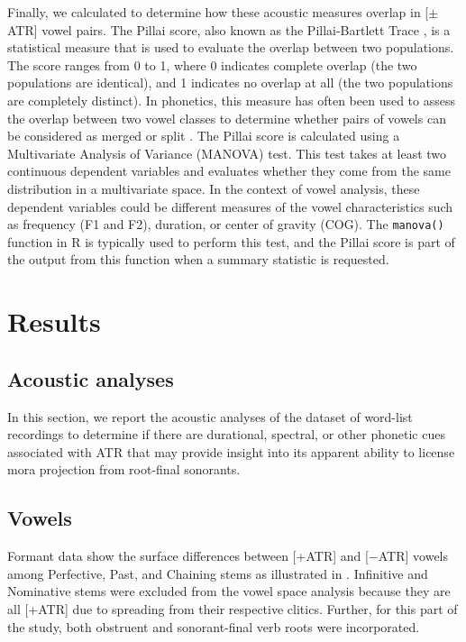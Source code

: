 \documentclass[output=paper,colorlinks,citecolor=brown]{langscibook}
\begin{document}
Finally, we calculated  to determine how these acoustic measures overlap in [$\pm$ATR] vowel pairs. The Pillai score, also known as the Pillai-Bartlett Trace \citep{pillai1955}, is a statistical measure that is used to evaluate the overlap between two populations. The score ranges from 0 to 1, where 0 indicates complete overlap (the two populations are identical), and 1 indicates no overlap at all (the two populations are completely distinct). In phonetics, this measure has often been used to assess the overlap between two vowel classes to determine whether pairs of vowels can be considered as merged or split \citep{freeman2023production, kelley2020comparison, mairanoetal2019}. The Pillai score is calculated using a Multivariate Analysis of Variance (MANOVA) test. This test takes at least two continuous dependent variables and evaluates whether they come from the same distribution in a multivariate space. In the context of vowel analysis, these dependent variables could be different measures of the vowel characteristics such as frequency (F1 and F2), duration, or center of gravity (COG). The \texttt{manova()} function in R is typically used to perform this test, and the Pillai score is part of the output from this function when a summary statistic is requested.

\section{Results}
\label{sec-res}

\subsection{Acoustic analyses}
\label{subsec-acous}

In this section, we report the acoustic analyses of the dataset of word-list recordings to determine if there are durational, spectral, or other phonetic cues associated with ATR that may provide insight into its apparent ability to license mora projection from root-final sonorants.

\subsection{Vowels}
\label{subsec-vow}

Formant data show the surface differences between [+ATR] and [−ATR] vowels among Perfective, Past, and Chaining stems as illustrated in . Infinitive and Nominative stems were excluded from the vowel space analysis because they are all [+ATR] due to spreading from their respective clitics. Further, for this part of the study, both obstruent and sonorant-final verb roots were incorporated. 
\end{document}
